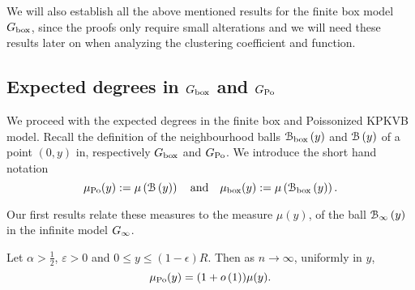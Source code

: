 We will also establish all the above mentioned results for the finite box model $G_{\mathrm{box}}$, since the proofs only require small 
alterations and we will need these results later on when analyzing the clustering coefficient and function.


\subsection{Expected degrees in $G_{\mathrm{box}}$ and $G_{{\mathrm{Po}}}$}\label{ssec:expected_degrees_GPo}

We proceed with the expected degrees in the finite box and Poissonized KPKVB model. Recall the definition of the neighbourhood balls ${\mathcal B}_{\text{box}}\left(y\right)$ and ${\mathcal B}\left(y\right)$ of a point $(0,y)$ in, respectively $G_{\mathrm{box}}$ and $G_{{\mathrm{Po}}}$. We introduce the short hand notation
\[
	\mu_{{\mathrm{Po}}}(y) := \mu\left({\mathcal B}\left(y\right)\right) \quad \text{and} \quad \mu_{\mathrm{box}}(y) := \mu\left({\mathcal B}_{\text{box}}\left(y\right)\right).
\]

Our first results relate these measures to the measure $\mu(y)$, of the ball ${\mathcal B}_{\infty}\left(y\right)$ in the infinite model $G_{\infty}$.

\begin{lemma}\label{lem:average_degree_P_n}
Let $\alpha > \frac{1}{2}$, $\varepsilon >0$ and $0 \leq y \leq (1-\epsilon)R$. Then as $n \to \infty$, uniformly in $y$,
\[
	\mu_{{\mathrm{Po}}}(y) = (1+o\left(1\right)) \mu(y).
\]
\end{lemma}

